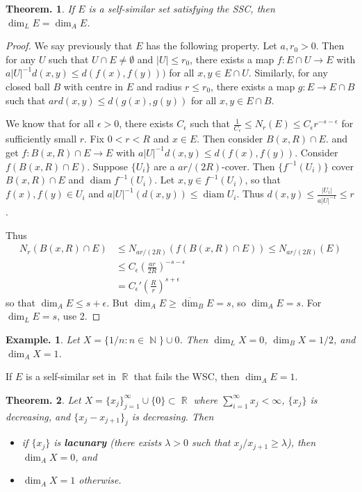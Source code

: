 \documentclass[11pt, a4paper]{memoir}
\DeclareMathOperator{\N}{{\mathbb{N}}}
\DeclareMathOperator{\R}{{\mathbb{R}}}
\theoremstyle{change}
\newtheorem{theorem}{Theorem.}[section]
\theoremstyle{plain}
\theoremstyle{nonumberplain}
\newtheorem{example}{Example.}
\newtheorem{proof}{Proof}
\newcommand{\defn}[1]{{\boldmath\bfseries #1}}
\DeclareMathOperator{\diam}{diam}
\numberwithin{equation}{section}
\begin{document}
\begin{theorem}
    If $E$ is a self-similar set satisfying the SSC, then $\dim_L E=\dim_A E$.
\end{theorem}
\begin{proof}
    We say previously that $E$ has the following property.
    Let $a,r_0>0$.
    Then for any $U$ such that $U\cap E\neq\emptyset$ and $|U|\leq r_0$, there exists a map $f:E\cap U\to E$ with $a|U|^{-1}d(x,y)\leq d(f(x),f(y)))$ for all $x,y\in E\cap U$.
    Similarly, for any closed ball $B$ with centre in $E$ and radius $r\leq r_0$, there exists a map $g:E\to E\cap B$ such that $ard(x,y)\leq d(g(x),g(y))$ for all $x,y\in E\cap B$.

    We know that for all $\epsilon>0$, there exists $C_\epsilon$ such that $\frac{1}{C_\epsilon}\leq N_r(E)\leq C_\epsilon r^{-s-\epsilon}$ for sufficiently small $r$.
    Fix $0<r<R$ and $x\in E$.
    Then consider $B(x,R)\cap E$. and get $f:B(x,R)\cap E\to E$ with $a|U|^{-1}d(x,y)\leq d(f(x),f(y))$.
    Consider $f(B(x,R)\cap E)$.
    Suppose $\{U_i\}$ are a $ar/(2R)$-cover.
    Then $\{f^{-1}(U_i)\}$ cover $B(x,R)\cap E$ and $\diam f^{-1}(U_i)$.
    Let $x,y\in f^{-1}(U_i)$, so that $f(x),f(y)\in U_i$ and $a|U|^{-1}(d(x,y))\leq\diam U_i$.
    Thus $d(x,y)\leq \frac{|U_i|}{a|U|^{-1}}\leq r$.

    Thus
    \begin{align*}
        N_r(B(x,R)\cap E)&\leq N_{ar/(2R)}(f(B(x,R)\cap E))\leq N_{ar/(2R)}(E)\\
                         &\leq C_\epsilon\left(\frac{ar}{2R}\right)^{-s-\epsilon}\\
                         &= C_\epsilon'\left(\frac{R}{r}\right)^{s+\epsilon}
    \end{align*}
    so that $\dim_A E\leq s+\epsilon$.
    But $\dim_A E\geq\overline{\dim}_B E=s$, so $\dim_A E=s$.
    For $\dim_L E=s$, use 2.
\end{proof}
\begin{example}
    Let $X=\{1/n:n\in\N\}\cup 0$.
    Then $\dim_L X=0$, $\dim_B X=1/2$, and $\dim_A X=1$.
\end{example}
If $E$ is a self-similar set in $\R$ that fails the WSC, then $\dim_A E=1$.
\begin{theorem}
    Let $X=\{x_j\}_{j=1}^\infty\cup\{0\}\subset\R$ where $\sum_{i=1}^\infty x_j<\infty$, $\{x_j\}$ is decreasing, and $\{x_j-x_{j+1}\}_j$ is decreasing.
    Then
    \begin{itemize}[nl]
        \item if $\{x_j\}$ is \defn{lacunary} (there exists $\lambda>0$ such that $x_j/x_{j+1}\geq\lambda$), then $\dim_A X=0$, and
        \item $\dim_A X=1$ otherwise.
    \end{itemize}
\end{theorem}
\end{document}
